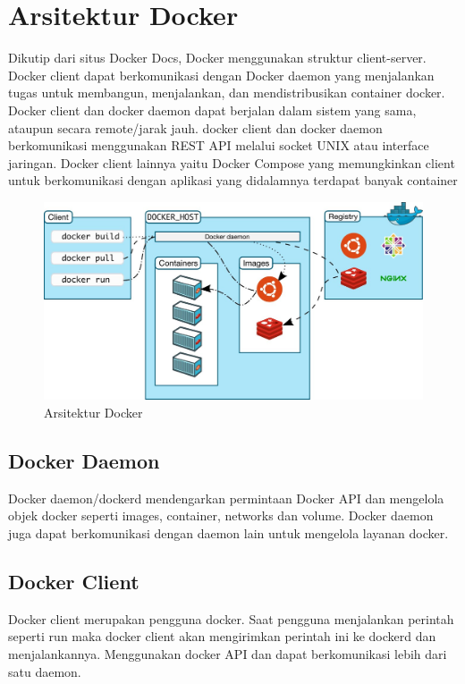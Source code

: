 \section{Arsitektur Docker}
Dikutip dari situs Docker Docs, Docker menggunakan struktur client-server. Docker client dapat berkomunikasi dengan Docker daemon yang menjalankan tugas untuk membangun, 
menjalankan, dan mendistribusikan container docker. Docker client dan docker daemon dapat berjalan dalam sistem yang sama, ataupun 
secara remote/jarak jauh. docker client dan docker daemon berkomunikasi menggunakan REST API melalui socket UNIX atau interface jaringan. 
Docker client lainnya yaitu Docker Compose yang memungkinkan client untuk berkomunikasi dengan aplikasi yang didalamnya terdapat banyak 
container

\begin{figure}
    \begin{center}
        \includegraphics[width=\linewidth]{image/architecture.jpg}
        \caption{Arsitektur Docker}
        \label{fig:my_figure2}
    \end{center}
\end{figure}


\subsection{Docker Daemon}
Docker daemon/dockerd mendengarkan permintaan Docker API dan mengelola objek docker seperti images, container, networks dan volume. 
Docker daemon juga dapat berkomunikasi dengan daemon lain untuk mengelola layanan docker.

\subsection{Docker Client}
Docker client merupakan pengguna docker. Saat pengguna menjalankan perintah seperti run maka docker client akan mengirimkan perintah 
ini ke dockerd dan menjalankannya. Menggunakan docker API dan dapat berkomunikasi lebih dari satu daemon.

